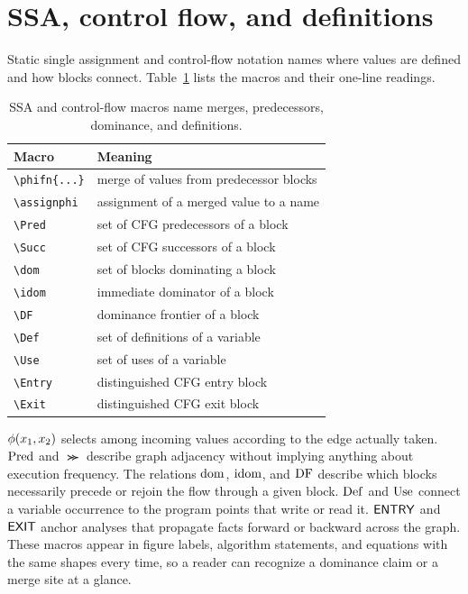 


\section{SSA, control flow, and definitions}
\label{sec:app-c-ssa-cfg}

Static single assignment and control-flow notation names where values are defined and how blocks connect.
Table~\ref{tab:app-c-ssa-cfg} lists the macros and their one-line readings.
\begin{table}
  \centering
  \caption{SSA and control-flow macros name merges, predecessors, dominance, and definitions.}
  \label{tab:app-c-ssa-cfg}
  \begin{tabular}{ll}
    \toprule
    Macro & Meaning \\
    \midrule
    \texttt{\textbackslash phifn\{...\}} & merge of values from predecessor blocks \\
    \texttt{\textbackslash assignphi} & assignment of a merged value to a name \\
    \texttt{\textbackslash Pred} & set of CFG predecessors of a block \\
    \texttt{\textbackslash Succ} & set of CFG successors of a block \\
    \texttt{\textbackslash dom} & set of blocks dominating a block \\
    \texttt{\textbackslash idom} & immediate dominator of a block \\
    \texttt{\textbackslash DF} & dominance frontier of a block \\
    \texttt{\textbackslash Def} & set of definitions of a variable \\
    \texttt{\textbackslash Use} & set of uses of a variable \\
    \texttt{\textbackslash Entry} & distinguished CFG entry block \\
    \texttt{\textbackslash Exit} & distinguished CFG exit block \\
    \bottomrule
  \end{tabular}
\end{table}
$\phi(x_1,x_2)$ selects among incoming values according to the edge actually taken.
$\operatorname{Pred}$ and $\Succ$ describe graph adjacency without implying anything about execution frequency.
The relations $\operatorname{dom}$, $\operatorname{idom}$, and $\operatorname{DF}$ describe which blocks necessarily precede or rejoin the flow through a given block.
$\operatorname{Def}$ and $\operatorname{Use}$ connect a variable occurrence to the program points that write or read it.
$\textsf{ENTRY}$ and $\textsf{EXIT}$ anchor analyses that propagate facts forward or backward across the graph.
These macros appear in figure labels, algorithm statements, and equations with the same shapes every time, so a reader can recognize a dominance claim or a merge site at a glance.


